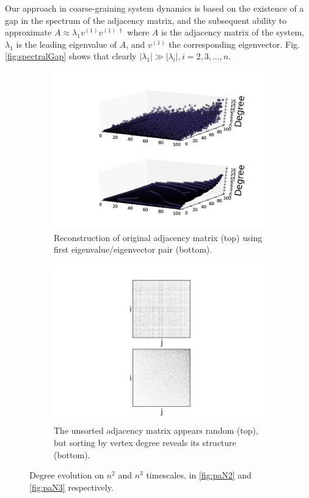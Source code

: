 \documentclass[11pt]{article}
\begin{document}
Our approach in coarse-graining system dynamics is based on the existence of a gap in the spectrum of the adjacency matrix, and the subsequent ability to approximate $A\approx \lambda_{1}v^{(1)}v^{(1) \;\dagger}$ where $A$ is the adjacency matrix of the system, $\lambda_{1}$ is the leading eigenvalue of $A$, and $v^{(1)}$ the corresponding eigenvector. Fig. \ref{fig:spectralGap} shows that clearly $|\lambda_{1}| \gg |\lambda_{i}|, i=2,3,...,n$. 
\begin{figure}[h!]
  \centering
  \begin{subfigure}{.5\textwidth}
    \centering
    \includegraphics[width=1.0\linewidth]{paRecon}
    \caption{Reconstruction of original adjacency matrix (top) using first eigenvalue/eigenvector pair (bottom).}
    \label{fig:paRecon}
  \end{subfigure}%
  \begin{subfigure}{.5\textwidth}
    \centering
    \includegraphics[width=1.0\linewidth]{paAdjSort}
    \caption{The unsorted adjacency matrix appears random (top), but sorting by vertex degree reveals its structure (bottom).}
    \label{fig:paAdjSort}
  \end{subfigure}%
  \caption{Degree evolution on $n^{2}$ and $n^{3}$ timescales, in \ref{fig:paN2} and \ref{fig:paN3} respectively.}
  \label{fig:paAdj}
\end{figure}
\end{document}
